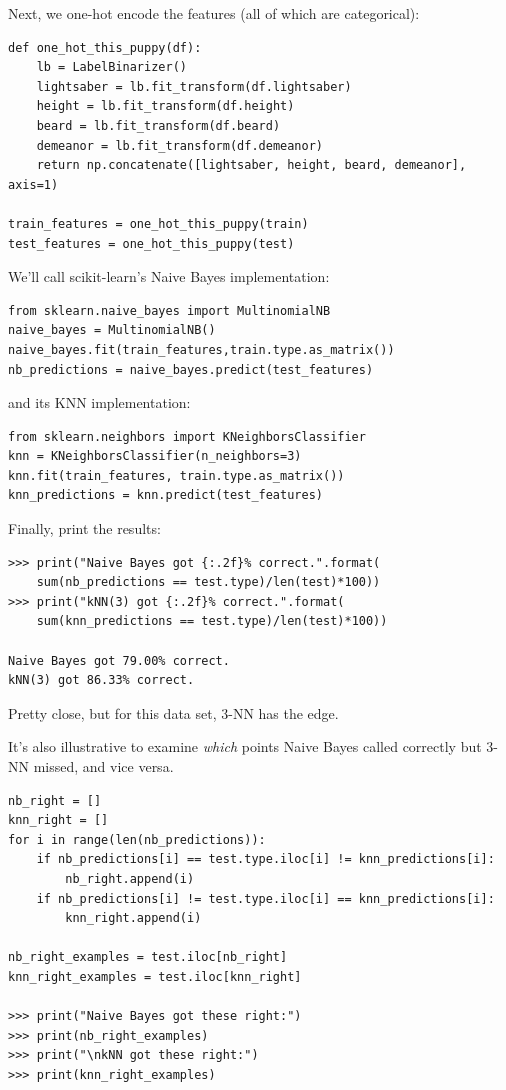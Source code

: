 \documentclass[12pt]{article}
\begin{document}
Next, we one-hot encode the features (all of which are categorical):

\small
\begin{Verbatim}[fontsize=\small,samepage=true,frame=none]
def one_hot_this_puppy(df):
    lb = LabelBinarizer()
    lightsaber = lb.fit_transform(df.lightsaber)
    height = lb.fit_transform(df.height)
    beard = lb.fit_transform(df.beard)
    demeanor = lb.fit_transform(df.demeanor)
    return np.concatenate([lightsaber, height, beard, demeanor], axis=1)

train_features = one_hot_this_puppy(train)
test_features = one_hot_this_puppy(test)
\end{Verbatim}
\normalsize

We'll call scikit-learn's Naive Bayes implementation:

\small
\begin{Verbatim}[fontsize=\small,samepage=true,frame=none]
from sklearn.naive_bayes import MultinomialNB
naive_bayes = MultinomialNB()
naive_bayes.fit(train_features,train.type.as_matrix())
nb_predictions = naive_bayes.predict(test_features)
\end{Verbatim}
\normalsize

and its KNN implementation:

\small
\begin{Verbatim}[fontsize=\small,samepage=true,frame=none]
from sklearn.neighbors import KNeighborsClassifier
knn = KNeighborsClassifier(n_neighbors=3)
knn.fit(train_features, train.type.as_matrix())
knn_predictions = knn.predict(test_features)
\end{Verbatim}
\normalsize

Finally, print the results:

\small
\begin{Verbatim}[fontsize=\small,samepage=true,frame=none]
>>> print("Naive Bayes got {:.2f}% correct.".format(
    sum(nb_predictions == test.type)/len(test)*100))
>>> print("kNN(3) got {:.2f}% correct.".format(
    sum(knn_predictions == test.type)/len(test)*100))

Naive Bayes got 79.00% correct.
kNN(3) got 86.33% correct.
\end{Verbatim}
\normalsize

Pretty close, but for this data set, 3-NN has the edge.
\pagebreak

It's also illustrative to examine \textit{which} points Naive Bayes called
correctly but 3-NN missed, and vice versa.

\footnotesize
\begin{Verbatim}[fontsize=\small,samepage=true,frame=none]
nb_right = []
knn_right = []
for i in range(len(nb_predictions)):
    if nb_predictions[i] == test.type.iloc[i] != knn_predictions[i]:
        nb_right.append(i)
    if nb_predictions[i] != test.type.iloc[i] == knn_predictions[i]:
        knn_right.append(i)

nb_right_examples = test.iloc[nb_right]
knn_right_examples = test.iloc[knn_right]

>>> print("Naive Bayes got these right:")
>>> print(nb_right_examples)
>>> print("\nkNN got these right:")
>>> print(knn_right_examples)
\end{Verbatim}
\end{document}
